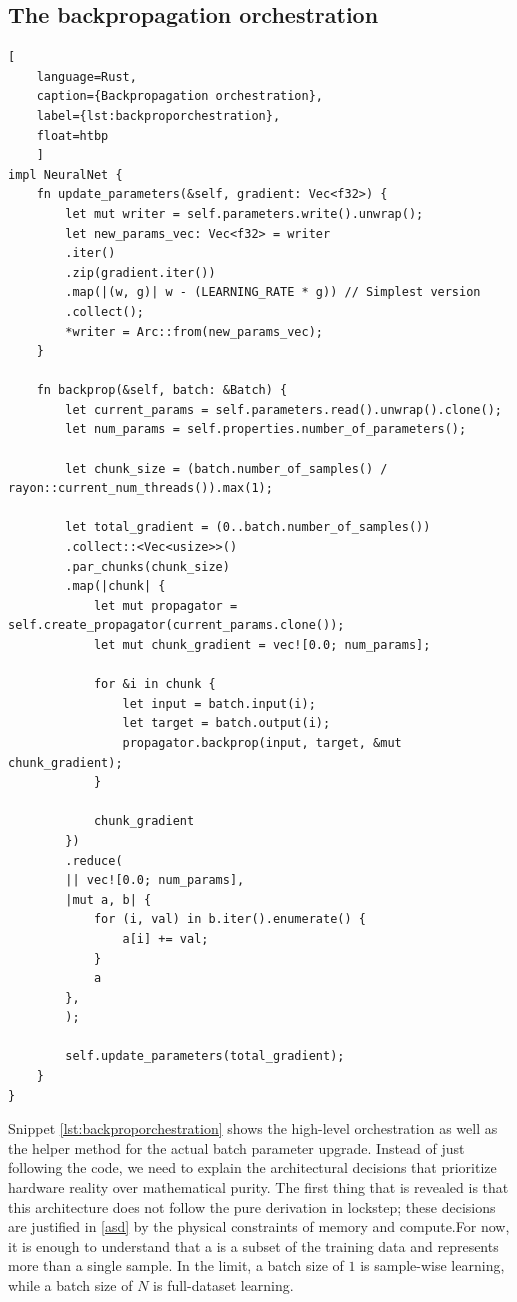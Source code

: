 \subsection{The backpropagation orchestration}
\begin{lstlisting}[
	language=Rust, 
	caption={Backpropagation orchestration}, 
	label={lst:backproporchestration},
	float=htbp
	]
impl NeuralNet {
	fn update_parameters(&self, gradient: Vec<f32>) {
		let mut writer = self.parameters.write().unwrap();
		let new_params_vec: Vec<f32> = writer
		.iter()
		.zip(gradient.iter())
		.map(|(w, g)| w - (LEARNING_RATE * g)) // Simplest version
		.collect();
		*writer = Arc::from(new_params_vec);
	}
	
	fn backprop(&self, batch: &Batch) {
		let current_params = self.parameters.read().unwrap().clone();
		let num_params = self.properties.number_of_parameters();
		
		let chunk_size = (batch.number_of_samples() / rayon::current_num_threads()).max(1);
		
		let total_gradient = (0..batch.number_of_samples())
		.collect::<Vec<usize>>()
		.par_chunks(chunk_size)
		.map(|chunk| {
			let mut propagator = self.create_propagator(current_params.clone());
			let mut chunk_gradient = vec![0.0; num_params];
			
			for &i in chunk {
				let input = batch.input(i);
				let target = batch.output(i);
				propagator.backprop(input, target, &mut chunk_gradient);
			}
			
			chunk_gradient
		})
		.reduce(
		|| vec![0.0; num_params],
		|mut a, b| {
			for (i, val) in b.iter().enumerate() {
				a[i] += val;
			}
			a
		},
		);
		
		self.update_parameters(total_gradient);
	}
}

\end{lstlisting}
Snippet \ref{lst:backproporchestration} shows the high-level orchestration as well as the helper method for the actual batch parameter upgrade. Instead of just following the code, we need to explain the architectural decisions that prioritize hardware reality over mathematical purity. The first thing that is revealed is that this architecture does not follow the pure derivation in lockstep; these decisions are justified in \ref{asd} by the physical constraints of memory and compute.For now, it is enough to understand that a  is a subset of the training data and represents more than a single sample. In the limit, a batch size of $1$ is sample-wise learning, while a batch size of $N$ is full-dataset learning. 
